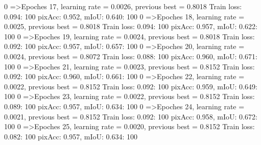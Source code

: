   0%
=>Epoches 17, learning rate = 0.0026,                 previous best = 0.8018
Train loss: 0.094: 100%
pixAcc: 0.952, mIoU: 0.640: 100%
  0%
=>Epoches 18, learning rate = 0.0025,                 previous best = 0.8018
Train loss: 0.094: 100%
pixAcc: 0.957, mIoU: 0.622: 100%
  0%
=>Epoches 19, learning rate = 0.0024,                 previous best = 0.8018
Train loss: 0.092: 100%
pixAcc: 0.957, mIoU: 0.657: 100%
  0%
=>Epoches 20, learning rate = 0.0024,                 previous best = 0.8072
Train loss: 0.088: 100%
pixAcc: 0.960, mIoU: 0.671: 100%
  0%
=>Epoches 21, learning rate = 0.0023,                 previous best = 0.8152
Train loss: 0.092: 100%
pixAcc: 0.960, mIoU: 0.661: 100%
  0%
=>Epoches 22, learning rate = 0.0022,                 previous best = 0.8152
Train loss: 0.092: 100%
pixAcc: 0.959, mIoU: 0.649: 100%
  0%
=>Epoches 23, learning rate = 0.0022,                 previous best = 0.8152
Train loss: 0.089: 100%
pixAcc: 0.957, mIoU: 0.634: 100%
  0%
=>Epoches 24, learning rate = 0.0021,                 previous best = 0.8152
Train loss: 0.092: 100%
pixAcc: 0.958, mIoU: 0.672: 100%
  0%
=>Epoches 25, learning rate = 0.0020,                 previous best = 0.8152
Train loss: 0.082: 100%
pixAcc: 0.957, mIoU: 0.634: 100%
